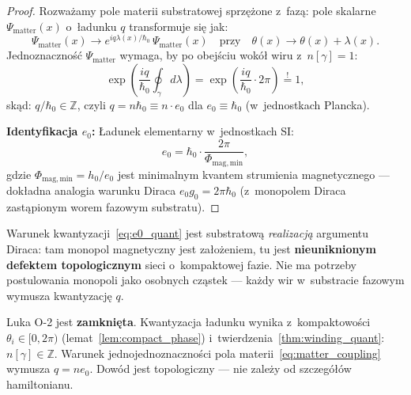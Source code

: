 \begin{proof}
Rozważamy pole materii substratowej sprzężone z~fazą:
pole skalarne $\Psi_\mathrm{matter}(x)$ o~ładunku $q$ transformuje się jak:
\begin{equation}
  \Psi_\mathrm{matter}(x) \to e^{iq\lambda(x)/\hbar_0}\,\Psi_\mathrm{matter}(x)
  \quad\text{przy}\quad
  \theta(x) \to \theta(x) + \lambda(x).
  \label{eq:matter_coupling}
\end{equation}
Jednoznaczność $\Psi_\mathrm{matter}$ wymaga, by po obejściu wokół
wiru z~$n[\gamma] = 1$:
\begin{equation}
  \exp\!\left(\frac{iq}{\hbar_0}\oint_\gamma d\lambda\right)
  = \exp\!\left(\frac{iq}{\hbar_0}\cdot 2\pi\right)
  \stackrel{!}{=} 1,
\end{equation}
skąd: $q/\hbar_0 \in \mathbb{Z}$, czyli $q = n\hbar_0 \equiv n\cdot e_0$
dla $e_0 \equiv \hbar_0$ (w~jednostkach Plancka).

\textbf{Identyfikacja $e_0$:} Ładunek elementarny w~jednostkach SI:
\begin{equation}
  \boxed{
    e_0
    = \hbar_0 \cdot
      \frac{2\pi}{\Phi_\mathrm{mag,min}},
  }
  \label{eq:e0_quant}
\end{equation}
gdzie $\Phi_\mathrm{mag,min} = h_0/e_0$ jest minimalnym kvantem
strumienia magnetycznego --- dokładna analogia warunku Diraca
$e_0 g_0 = 2\pi\hbar_0$ (z~monopolem Diraca zastąpionym worem
fazowym substratu).
\end{proof}

\begin{uwaga}
Warunek kwantyzacji~\eqref{eq:e0_quant} jest substratową
\emph{realizacją} argumentu Diraca: tam monopol magnetyczny
jest założeniem, tu jest \textbf{nieuniknionym defektem topologicznym}
sieci o~kompaktowej fazie. Nie ma potrzeby postulowania monopoli
jako osobnych cząstek --- każdy wir w~substracie fazowym
wymusza kwantyzację $q$.
\end{uwaga}

\begin{uwaga}
Luka O-2 jest \textbf{zamknięta}. Kwantyzacja ładunku wynika
z~kompaktowości $\theta_i \in [0,2\pi)$ (lemat~\ref{lem:compact_phase})
i~twierdzenia~\ref{thm:winding_quant}: $n[\gamma] \in \mathbb{Z}$.
Warunek jednojednoznaczności pola materii~\eqref{eq:matter_coupling}
wymusza $q = n e_0$. Dowód jest topologiczny --- nie zależy od
szczegółów hamiltonianu.
\end{uwaga}

